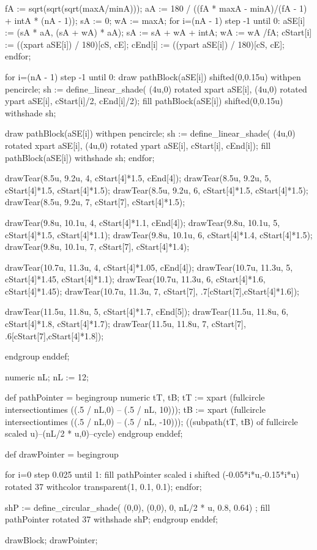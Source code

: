 fA := sqrt(sqrt(sqrt(maxA/minA)));
aA := 180 / ((fA * maxA - minA)/(fA - 1) + intA * (nA - 1)); %
sA := 0; %
wA := maxA; %
for i=(nA - 1) step -1 until 0:
	aSE[i] := (sA * aA, (sA + wA) * aA);
	sA := sA + wA + intA;
	wA := wA /fA;
	cStart[i] := ((xpart aSE[i]) / 180)[cS, cE];
	cEnd[i] := ((ypart aSE[i]) / 180)[cS, cE];
endfor;

for i=(nA - 1) step -1 until 0:
	draw pathBlock(aSE[i]) shifted(0,0.15u) withpen pencircle;
	sh := define_linear_shade(
			(4u,0) rotated xpart aSE[i],
			(4u,0) rotated ypart aSE[i],
			cStart[i]/2,
			cEnd[i]/2);
	fill pathBlock(aSE[i]) shifted(0,0.15u) withshade sh;

	draw pathBlock(aSE[i]) withpen pencircle;
	sh := define_linear_shade(
			(4u,0) rotated xpart aSE[i],
			(4u,0) rotated ypart aSE[i],
			cStart[i],
			cEnd[i]);
	fill pathBlock(aSE[i]) withshade sh;
endfor;

drawTear(8.5u, 9.2u, 4, cStart[4]*1.5, cEnd[4]);
drawTear(8.5u, 9.2u, 5, cStart[4]*1.5, cStart[4]*1.5);
drawTear(8.5u, 9.2u, 6, cStart[4]*1.5, cStart[4]*1.5);
drawTear(8.5u, 9.2u, 7, cStart[7], cStart[4]*1.5);

drawTear(9.8u, 10.1u, 4, cStart[4]*1.1, cEnd[4]);
drawTear(9.8u, 10.1u, 5, cStart[4]*1.5, cStart[4]*1.1);
drawTear(9.8u, 10.1u, 6, cStart[4]*1.4, cStart[4]*1.5);
drawTear(9.8u, 10.1u, 7, cStart[7], cStart[4]*1.4);

drawTear(10.7u, 11.3u, 4, cStart[4]*1.05, cEnd[4]);
drawTear(10.7u, 11.3u, 5, cStart[4]*1.45, cStart[4]*1.1);
drawTear(10.7u, 11.3u, 6, cStart[4]*1.6, cStart[4]*1.45);
drawTear(10.7u, 11.3u, 7, cStart[7], .7[cStart[7],cStart[4]*1.6]);

drawTear(11.5u, 11.8u, 5, cStart[4]*1.7, cEnd[5]);
drawTear(11.5u, 11.8u, 6, cStart[4]*1.8, cStart[4]*1.7);
drawTear(11.5u, 11.8u, 7, cStart[7], .6[cStart[7],cStart[4]*1.8]);

endgroup
enddef;

numeric nL;
nL := 12; %

def pathPointer =
begingroup
numeric tT, tB;
tT := xpart (fullcircle intersectiontimes ((.5 / nL,0) -- (.5 / nL, 10)));
tB := xpart (fullcircle intersectiontimes ((.5 / nL,0) -- (.5 / nL, -10)));
((subpath(tT, tB) of fullcircle scaled u)--(nL/2 * u,0)--cycle)
endgroup
enddef;

def drawPointer =
begingroup

for i=0 step 0.025 until 1:
	fill pathPointer scaled i shifted (-0.05*i*u,-0.15*i*u) rotated 37 withcolor transparent(1, 0.1, 0.1);
endfor;

shP := define_circular_shade(
		(0,0),
		(0,0),
		0,
		nL/2 * u,
		0.8,
		0.64) ;
fill pathPointer rotated 37 withshade shP;
endgroup
enddef;

drawBlock;
drawPointer;

\stopreusableMPgraphic
